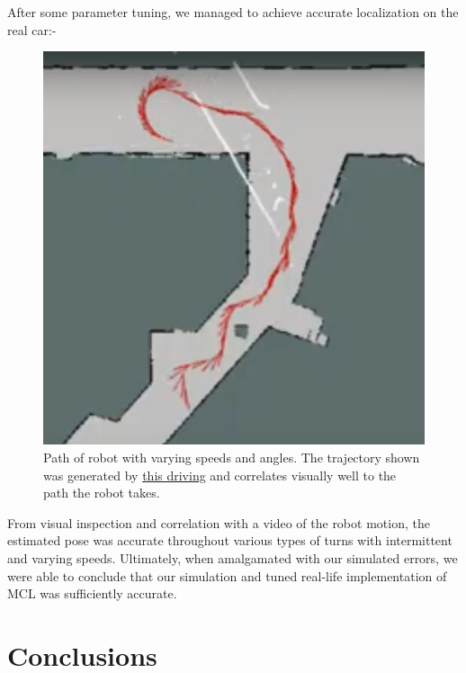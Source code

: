 \documentclass[11pt,twocolumn]{article}
\begin{document}
After some parameter tuning, we managed to achieve accurate localization on the real car:-

\begin{figure}[H]
    \centering
\includegraphics[scale=0.25]{figures/implementation_trail.png}
    \caption{Path of robot with varying speeds and angles. The trajectory shown was generated by \href{https://drive.google.com/file/d/13M48duxxxUkJKxFIRrq0tKB9kBgh_u8O/view?resourcekey}{this driving} and correlates visually well to the path the robot takes.}
    \label{fig:5}
\end{figure}

From visual inspection and correlation with a video of the robot motion, the estimated pose was accurate throughout various types of turns with intermittent and varying speeds. Ultimately, when amalgamated with our simulated errors, we were able to conclude that our simulation and tuned real-life implementation of MCL was sufficiently accurate. 

\section{Conclusions}

\end{document}
